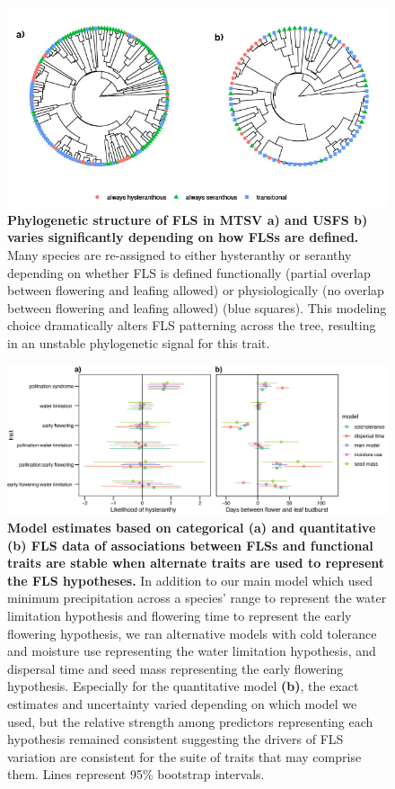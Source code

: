 \documentclass[11pt]{article}
\begin{document}
\begin{figure}[H]
\centering
\includegraphics[width=\textwidth]{..//..//cicletrees.jpg} 
  \caption{\textbf{Phylogenetic structure of FLS in MTSV \textbf{a)} and USFS \textbf{b)} varies significantly depending on how FLSs are defined.} Many species are re-assigned to either hysteranthy or seranthy depending on whether FLS is defined functionally (partial overlap between flowering and leafing allowed) or physiologically (no overlap between flowering and leafing allowed) (blue squares). This modeling choice dramatically alters FLS patterning across the tree, resulting in an unstable phylogenetic signal for this trait.}
    \label{fig:phylogeny}
    \end{figure}

\begin{figure}[H]
\centering
\includegraphics[width=\textwidth]{..//..//alternatepredictors.png} 
  \caption{\textbf{Model estimates based on categorical (a) and quantitative (b) FLS data of associations between FLSs and functional traits are stable when alternate traits are used to represent the FLS hypotheses.} In addition to our main model which used minimum precipitation across a species' range to represent the water limitation hypothesis and flowering time to represent the early flowering hypothesis, we ran alternative models with cold tolerance and moisture use representing the water limitation hypothesis, and dispersal time and seed mass representing the early flowering hypothesis. Especially for the quantitative model \textbf{(b)}, the exact estimates and uncertainty varied depending on which model we used, but the relative strength among predictors representing each hypothesis remained consistent suggesting the drivers of FLS variation are consistent for the suite of traits that may comprise them. Lines represent 95\% bootstrap intervals.} 
    \label{fig:altpreds}
    \end{figure}
    
\end{document}
